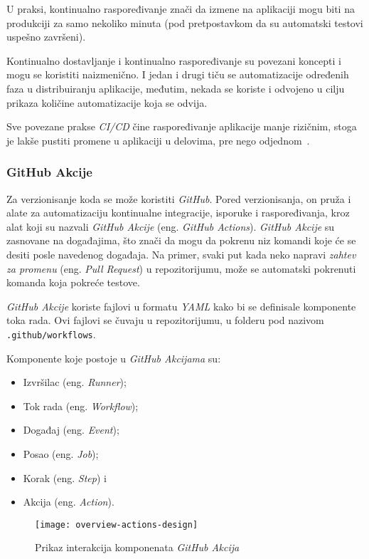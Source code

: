 U praksi, kontinualno raspoređivanje znači da izmene na aplikaciji mogu biti na produkciji za samo 
nekoliko minuta (pod pretpostavkom da su automatski testovi uspešno završeni).

Kontinualno dostavljanje i kontinualno raspoređivanje su povezani koncepti i mogu se koristiti naizmenično. 
I jedan i drugi tiču se automatizacije određenih faza u distribuiranju aplikacije, 
međutim, nekada se koriste i odvojeno u cilju prikaza količine automatizacije koja se odvija.

Sve povezane prakse \textit{CI/CD} čine raspoređivanje aplikacije manje rizičnim, stoga je lakše pustiti 
promene u aplikaciji u delovima, pre nego odjednom~\cite{CI_CD}.

\subsubsection{GitHub Akcije}
Za verzionisanje koda se može koristiti \textit{GitHub}. Pored verzionisanja, on pruža i alate za automatizaciju 
kontinualne integracije, isporuke i raspoređivanja, kroz alat koji su nazvali \textit{GitHub Akcije} 
(eng. \textit{GitHub Actions}). 
\textit{GitHub Akcije} su zasnovane na događajima, što znači da mogu da pokrenu niz komandi koje će se desiti 
posle navedenog događaja. Na primer, svaki put kada neko napravi \textit{zahtev za promenu} 
(eng. \textit{Pull Request}) u repozitorijumu, može se automatski pokrenuti komanda koja pokreće 
testove. 

\textit{GitHub Akcije} koriste fajlovi u formatu \textit{YAML} kako bi se definisale komponente toka rada. Ovi fajlovi 
se čuvaju u repozitorijumu, u folderu pod nazivom \mbox{\texttt{.github/workflows}}.

Komponente koje postoje u \textit{GitHub Akcijama} su: 

\begin{itemize}
    \item Izvršilac (eng. \textit{Runner});
    \item Tok rada (eng. \textit{Workflow});
    \item Događaj (eng. \textit{Event});
    \item Posao (eng. \textit{Job});
    \item Korak (eng. \textit{Step}) i
    \item Akcija (eng. \textit{Action}).
\end{itemize}

\begin{figure}[h]
    \centering
    \texttt{[image: overview-actions-design]}
    \caption{Prikaz interakcija komponenata \textit{GitHub Akcija}}
\end{figure}

